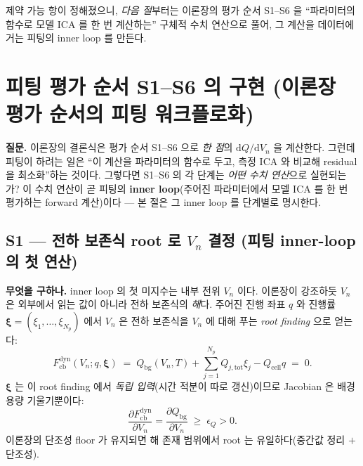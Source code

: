 \documentclass[11pt,a4paper]{article}
\newcommand{\dd}{\mathrm{d}}
\newcommand{\bg}{\mathrm{bg}}
\newcommand{\cell}{\mathrm{cell}}
\newcommand{\tot}{\mathrm{tot}}
\newcommand{\cb}{\mathrm{cb}}
\newcommand{\dyn}{\mathrm{dyn}}
\begin{document}
제약 가능 항이 정해졌으니, \emph{다음 절}부터는 이론장의 평가 순서 S1--S6 을 ``파라미터의 함수로 모델 ICA 를
한 번 계산하는'' 구체적 수치 연산으로 풀어, 그 계산을 데이터에 거는 피팅의 inner loop 를 만든다.

\section{피팅 평가 순서 S1--S6 의 구현 (이론장 평가 순서의 피팅 워크플로화)}\label{sec:ch6_S}
\textbf{질문.} 이론장의 결론식은 평가 순서 S1--S6 으로 \emph{한 점}의 $\dd Q/\dd V_n$ 을 계산한다. 그런데 피팅이
하려는 일은 ``이 계산을 파라미터의 함수로 두고, 측정 ICA 와 비교해 residual 을 최소화''하는 것이다. 그렇다면
S1--S6 의 각 단계는 \emph{어떤 수치 연산}으로 실현되는가? 이 수치 연산이 곧 피팅의 \textbf{inner loop}(주어진
파라미터에서 모델 ICA 를 한 번 평가하는 forward 계산)이다 — 본 절은 그 inner loop 를 단계별로 명시한다.

\subsection{S1 — 전하 보존식 root 로 $V_n$ 결정 (피팅 inner-loop 의 첫 연산)}\label{sec:ch6_S1}
\textbf{무엇을 구하나.} inner loop 의 첫 미지수는 내부 전위 $V_n$ 이다. 이론장이 강조하듯 $V_n$ 은 외부에서
읽는 값이 아니라 전하 보존식의 \emph{해}다. 주어진 진행 좌표 $q$ 와 진행률 $\bm\xi=(\xi_1,\dots,\xi_{N_p})$ 에서
$V_n$ 은 전하 보존식을 $V_n$ 에 대해 푸는 \emph{root finding} 으로 얻는다:
\begin{equation}
F_\cb^\dyn(V_n;q,\bm\xi)\;=\;Q_\bg(V_n,T)+\sum_{j=1}^{N_p}Q_{j,\tot}\xi_j-Q_\cell q\;=\;0.
\label{eq:ch6_dyn_root}
\end{equation}
$\bm\xi$ 는 이 root finding 에서 \emph{독립 입력}(시간 적분이 따로 갱신)이므로 Jacobian 은 배경 용량 기울기뿐이다:
\begin{equation}
\frac{\partial F_\cb^\dyn}{\partial V_n}=\frac{\partial Q_\bg}{\partial V_n}\;\ge\;\epsilon_Q>0.
\label{eq:ch6_dyn_deriv}
\end{equation}
이론장의 단조성 floor 가 유지되면 해 존재 범위에서 root 는 유일하다(중간값 정리 $+$ 단조성).
\end{document}
